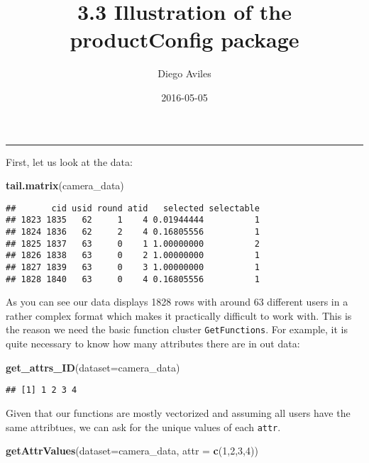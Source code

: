 \documentclass[]{article}
\title{3.3 Illustration of the productConfig package}
\author{Diego Aviles}
\date{2016-05-05}
\newenvironment{Shaded}{\begin{snugshade}}{\end{snugshade}}
\newcommand{\KeywordTok}[1]{\textcolor[rgb]{0.13,0.29,0.53}{\textbf{{#1}}}}
\newcommand{\DataTypeTok}[1]{\textcolor[rgb]{0.13,0.29,0.53}{{#1}}}
\newcommand{\DecValTok}[1]{\textcolor[rgb]{0.00,0.00,0.81}{{#1}}}
\newcommand{\NormalTok}[1]{{#1}}
\begin{document}
\maketitle


\begin{center}\rule{0.5\linewidth}{\linethickness}\end{center}

First, let us look at the data:

\begin{Shaded}
\begin{Highlighting}[]
\KeywordTok{tail.matrix}\NormalTok{(camera_data)}
\end{Highlighting}
\end{Shaded}

\begin{verbatim}
##       cid usid round atid   selected selectable
## 1823 1835   62     1    4 0.01944444          1
## 1824 1836   62     2    4 0.16805556          1
## 1825 1837   63     0    1 1.00000000          2
## 1826 1838   63     0    2 1.00000000          1
## 1827 1839   63     0    3 1.00000000          1
## 1828 1840   63     0    4 0.16805556          1
\end{verbatim}

As you can see our data displays 1828 rows with around 63 different
users in a rather complex format which makes it practically difficult to
work with. This is the reason we need the basic function cluster
\texttt{GetFunctions}. For example, it is quite necessary to know how
many attributes there are in out data:

\begin{Shaded}
\begin{Highlighting}[]
\KeywordTok{get_attrs_ID}\NormalTok{(}\DataTypeTok{dataset=}\NormalTok{camera_data)}
\end{Highlighting}
\end{Shaded}

\begin{verbatim}
## [1] 1 2 3 4
\end{verbatim}

Given that our functions are mostly vectorized and assuming all users
have the same attribtues, we can ask for the unique values of each
\texttt{attr}.

\begin{Shaded}
\begin{Highlighting}[]
\KeywordTok{getAttrValues}\NormalTok{(}\DataTypeTok{dataset=}\NormalTok{camera_data, }\DataTypeTok{attr =} \KeywordTok{c}\NormalTok{(}\DecValTok{1}\NormalTok{,}\DecValTok{2}\NormalTok{,}\DecValTok{3}\NormalTok{,}\DecValTok{4}\NormalTok{))}
\end{Highlighting}
\end{Shaded}
\end{document}
